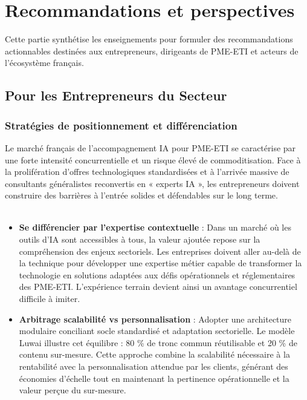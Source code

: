 \chapter{Recommandations et perspectives}
\label{chap:recommendations}

Cette partie synthétise les enseignements pour formuler des recommandations actionnables destinées aux entrepreneurs, dirigeants de PME-ETI et acteurs de l'écosystème français.

\section{Pour les Entrepreneurs du Secteur}

\subsection{Stratégies de positionnement et différenciation}

Le marché français de l'accompagnement IA pour PME-ETI se caractérise par une forte intensité concurrentielle et un risque élevé de commoditisation. Face à la prolifération d'offres technologiques standardisées et à l'arrivée massive de consultants généralistes reconvertis en « experts IA », les entrepreneurs doivent construire des barrières à l'entrée solides et défendables sur le long terme.
\\\\
\begin{itemize}
    \item \textbf{Se différencier par l'expertise contextuelle} : Dans un marché où les outils d’IA sont accessibles à tous, la valeur ajoutée repose sur la compréhension des enjeux sectoriels. Les entreprises doivent aller au-delà de la technique pour développer une expertise métier capable de transformer la technologie en solutions adaptées aux défis opérationnels et réglementaires des PME-ETI. L’expérience terrain devient ainsi un avantage concurrentiel difficile à imiter.

    \item \textbf{Arbitrage scalabilité vs personnalisation} : Adopter une architecture modulaire conciliant socle standardisé et adaptation sectorielle. Le modèle Luwai illustre cet équilibre : 80 \% de tronc commun réutilisable et 20 \% de contenu sur-mesure. Cette approche combine la scalabilité nécessaire à la rentabilité avec la personnalisation attendue par les clients, générant des économies d’échelle tout en maintenant la pertinence opérationnelle et la valeur perçue du sur-mesure.
\end{itemize}

